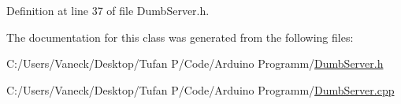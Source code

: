 Definition at line 37 of file Dumb\+Server.\+h.



The documentation for this class was generated from the following files\+:\begin{DoxyCompactItemize}
\item 
C\+:/\+Users/\+Vaneck/\+Desktop/\+Tufan P/\+Code/\+Arduino Programm/\mbox{\hyperlink{_dumb_server_8h}{Dumb\+Server.\+h}}\item 
C\+:/\+Users/\+Vaneck/\+Desktop/\+Tufan P/\+Code/\+Arduino Programm/\mbox{\hyperlink{_dumb_server_8cpp}{Dumb\+Server.\+cpp}}\end{DoxyCompactItemize}
